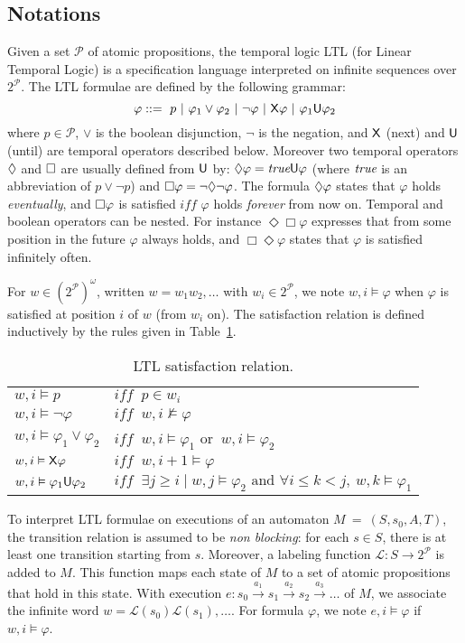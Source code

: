 	\subsection{Notations}
	Given a set $\mathcal{P}$ of atomic propositions, the
temporal logic \textsf{LTL} (for Linear Temporal Logic) is a
specification language interpreted on infinite sequences over
$2^{\mathcal{P}}$.  The \textsf{LTL} formulae are defined by the
following grammar:\label{LTL}
\[\varphi::=~p~|~\varphi_1\vee\varphi_2~|~\neg\varphi~|~\mathsf{X}\varphi~|
~\varphi_1 \mathsf{U} \varphi_2\]
where $p \in \mathcal{P}$, $\vee$ is the boolean disjunction, $\neg$
is the negation, and $\mathsf{X}$ (next) and $\mathsf{U}$ (until) are temporal
operators described below.
Moreover two temporal operators $\Diamond$ and $\Box$ are usually defined from
$\mathsf{U}$ by: $\Diamond\varphi = \textit{true} \mathsf{U} \varphi$ (where $\textit{true}$ is an abbreviation of 
$p \vee \neg p$) and 
$\Box\varphi=\neg\Diamond\neg\varphi$. The formula $\Diamond\varphi$ states that
$\varphi$ holds \emph{eventually}, and $\Box\varphi$ is satisfied
$\textit{iff } \varphi$ holds \emph{forever} from now on.
Temporal and boolean operators can be nested. For instance
$\Diamond\Box\varphi$ expresses that from some position in the future
$\varphi$ always holds, and $\Box\Diamond\varphi$ states that
$\varphi$ is satisfied infinitely often.

For $w \in (2^{\mathcal{P}})^\omega$, written $w=w_1 w_2, \dots$ with
$w_i \in 2^{\mathcal{P}}$, we note $w,i \vDash \varphi$ when $\varphi$
is satisfied at position $i$ of $w$ (\ie from $w_i$ on).
The satisfaction relation is defined inductively by the rules given in
Table~\ref{table}.
 \begin{table}[h!] 
 \center
 \begin{tabular}{ll} 
 $w, i \vDash p$ &$\textit{iff } \ p \in w_i$\\ 
 $w, i \vDash \neg \varphi$ &$\textit{iff } \ w, i \nvDash \varphi$\\ 
 $w, i \vDash \varphi_1 \vee \varphi_2$ & $\textit{iff } \ w, i \vDash 
\varphi_1$ or $ \ w, i \vDash \varphi_2$\\ 
 $w, i \vDash \mathsf{X}\varphi$ &$\textit{iff } \ w, i+1 \vDash \varphi$\\ 
 $w, i \vDash \varphi_1\mathsf{U}\varphi_2$ &$ \textit{iff } \ \exists j \geq i 
\mid w, j \vDash \varphi_2 \text{ and }\forall i \leq k < j, \ w,k \vDash \varphi_1$
\end{tabular} 
\caption{\textsf{LTL} satisfaction relation.} \label{table}
\end{table}

\smallskip To interpret \textsf{LTL} formulae on executions of an
automaton $M~=~(S,s_0,A,T)$, the transition relation is assumed to be
\emph{non blocking}: for each $s \in S$, there is at least one
transition starting from $s$.  Moreover, a labeling function
$\mathcal{L}: S \rightarrow 2^{\mathcal{P}}$ is added to $M$. This
function maps each state of $M$ to a set of atomic propositions that
hold in this state.
With execution $e: s_0 \xrightarrow{a_1} s_1 \xrightarrow{a_2} s_2
\xrightarrow{a_3} \ldots$ of $M$, we associate the infinite word 
$w = \mathcal{L}(s_0) \mathcal{L}(s_1), \dots$. 
For formula $\varphi$, we note $e, i \vDash \varphi$ if $w,i \vDash \varphi$. 


